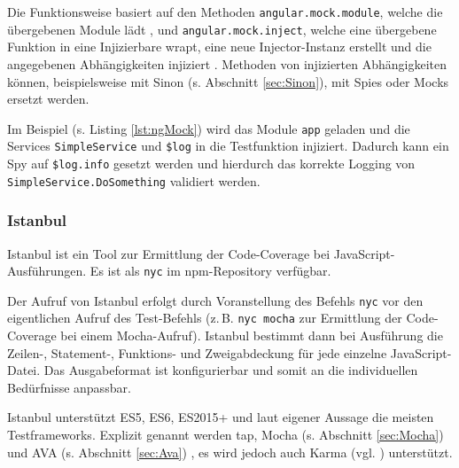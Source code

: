Die Funktionsweise basiert auf den Methoden \texttt{angular.mock.module}, welche die übergebenen Module lädt \cite{angular-ngMockModule}, und \texttt{angular.mock.inject}, welche eine übergebene Funktion in eine Injizierbare wrapt, eine neue Injector-Instanz erstellt und die angegebenen Abhängigkeiten injiziert \cite{angular-ngMockInject}. Methoden von injizierten Abhängigkeiten können, beispielsweise mit Sinon (s. Abschnitt \ref{sec:Sinon}), mit Spies oder Mocks ersetzt werden.

\begin{figure}[H]
	
\end{figure}

Im Beispiel (s. Listing \ref{lst:ngMock}) wird das Module \texttt{app} geladen und die Services \texttt{SimpleService} und \texttt{\$log} in die Testfunktion injiziert. Dadurch kann ein Spy auf \texttt{\$log.info} gesetzt werden und hierdurch das korrekte Logging von \texttt{SimpleService.DoSomething} validiert werden.

\subsubsection{Istanbul}
Istanbul ist ein Tool zur Ermittlung der Code-Coverage bei JavaScript-Ausführungen. Es ist als \texttt{nyc} im npm-Repository verfügbar. \cite{istanbul}

Der Aufruf von Istanbul erfolgt durch Voranstellung des Befehls \texttt{nyc} vor den eigentlichen Aufruf des Test-Befehls (z.\,B. \texttt{nyc mocha} zur Ermittlung der Code-Coverage bei einem Mocha-Aufruf). Istanbul bestimmt dann bei Ausführung die Zeilen-, Statement-, Funktions- und Zweigabdeckung für jede einzelne JavaScript-Datei. Das Ausgabeformat ist konfigurierbar und somit an die individuellen Bedürfnisse anpassbar. \cite{istanbul}

Istanbul unterstützt ES5, ES6, ES2015+ und laut eigener Aussage die meisten Testframeworks. Explizit genannt werden tap, Mocha (s. Abschnitt \ref{sec:Mocha}) und AVA (s. Abschnitt \ref{sec:Ava}) \cite{istanbul}, es wird jedoch auch Karma (vgl.  \cite{istanbul-karma}) unterstützt.